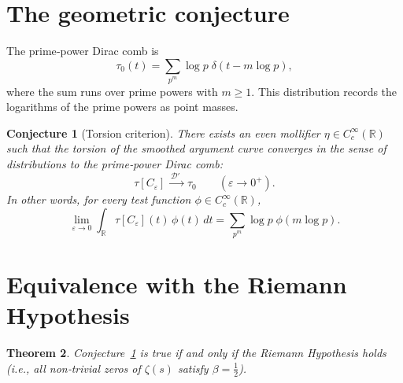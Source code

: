 \documentclass[12pt,a4paper]{article}
\newtheorem{theorem}{Theorem}[section]
\newtheorem{conjecture}[theorem]{Conjecture}
\newcommand{\R}{\mathbb{R}}
\newcommand{\D}{\mathcal{D}'}
\begin{document}
\section{The geometric conjecture}

The prime‑power Dirac comb is
\[
\tau_0(t) = \sum_{p^m} \log p \; \delta(t - m\log p),
\]
where the sum runs over prime powers with \(m\ge 1\).  This distribution records the
logarithms of the prime powers as point masses.

\begin{conjecture}[Torsion criterion]\label{conj:main}
There exists an even mollifier \(\eta\in C_c^\infty(\R)\) such that the torsion of the
smoothed argument curve converges in the sense of distributions to the prime‑power Dirac
comb:
\[
\tau[C_\varepsilon] \xrightarrow{\;\D\;\;} \tau_0 \qquad (\varepsilon\to 0^+).
\]
In other words, for every test function \(\phi\in C_c^\infty(\R)\),
\[
\lim_{\varepsilon\to0} \int_{\R} \tau[C_\varepsilon](t)\,\phi(t)\,dt
= \sum_{p^m} \log p \; \phi(m\log p).
\]
\end{conjecture}

\section{Equivalence with the Riemann Hypothesis}

\begin{theorem}\label{thm:equiv}
Conjecture~\ref{conj:main} is true if and only if the Riemann Hypothesis holds (i.e., all
non‑trivial zeros of \(\zeta(s)\) satisfy \(\beta = \frac12\)).
\end{theorem}
\end{document}
